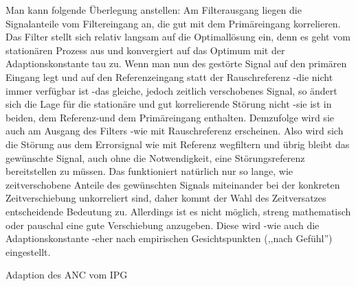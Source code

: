 \documentclass[a4paper]{article}
\begin{document}
\begin{multicols}{3}
\begin{itemize*}
    \item Man kann folgende Überlegung anstellen: Am Filterausgang liegen die Signalanteile vom Filtereingang an, die gut mit dem Primäreingang korrelieren. Das Filter stellt sich relativ langsam auf die Optimallösung ein, denn es geht vom stationären Prozess aus und konvergiert auf das Optimum mit der Adaptionskonstante tau zu. Wenn man nun des gestörte Signal auf den primären Eingang legt und auf den Referenzeingang statt der Rauschreferenz -die nicht immer verfügbar ist -das gleiche, jedoch zeitlich verschobenes Signal, so ändert sich die Lage für die stationäre und gut korrelierende Störung nicht -sie ist in beiden, dem Referenz-und dem Primäreingang enthalten. Demzufolge wird sie auch am Ausgang des Filters -wie mit Rauschreferenz erscheinen. Also wird sich die Störung aus dem Errorsignal wie mit Referenz wegfiltern und übrig bleibt das gewünschte Signal, auch ohne die Notwendigkeit, eine Störungsreferenz bereitstellen zu müssen. Das funktioniert natürlich nur so lange, wie zeitverschobene Anteile des gewünschten Signals miteinander bei der konkreten Zeitverschiebung unkorreliert sind, daher kommt der Wahl des Zeitversatzes entscheidende Bedeutung zu. Allerdings ist es nicht möglich, streng mathematisch oder pauschal eine gute Verschiebung anzugeben. Diese wird -wie auch die Adaptionskonstante -eher nach empirischen Gesichtspunkten (,,nach Gefühl'') eingestellt.
  \end{itemize*}

  Adaption des ANC vom IPG


\end{multicols}
\end{document}
